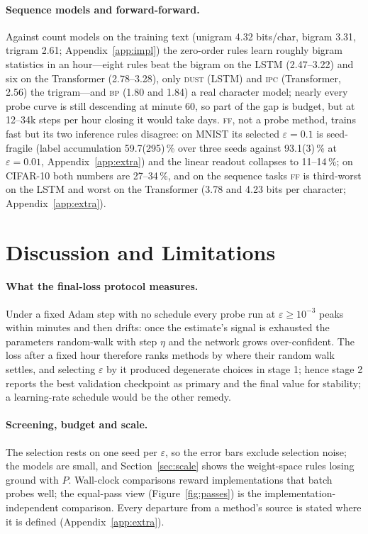 \documentclass{article}
\newcommand{\method}[1]{\textsc{#1}}
\newcommand{\BP}{\method{bp}}
\newcommand{\FF}{\method{ff}}
\newcommand{\DUST}{\method{dust}}
\newcommand{\IPC}{\method{ipc}}
\begin{document}
\paragraph{Sequence models and forward-forward.}
Against count models on the training text (unigram 4.32 bits/char, bigram 3.31,
trigram 2.61; Appendix~\ref{app:impl}) the zero-order rules learn roughly bigram
statistics in an hour---eight rules beat the bigram on the LSTM (2.47--3.22) and six on
the Transformer (2.78--3.28), only \DUST{} (LSTM) and \IPC{} (Transformer, 2.56) the trigram---and \BP{} (1.80 and 1.84) a real
character model; nearly every probe curve is still descending at minute 60, so part of the gap is
budget, but at 12--34k steps per hour closing it would take days. \FF{}, not a probe method, trains fast but its two inference rules disagree: on MNIST its selected $\varepsilon=0.1$ is seed-fragile (label accumulation
59.7(295)\,\% over three seeds against 93.1(3)\,\% at $\varepsilon=0.01$, Appendix~\ref{app:extra}) and the
linear readout collapses to 11--14\,\%; on CIFAR-10 both numbers are 27--34\,\%, and on the sequence tasks \FF{} is third-worst on the LSTM and
worst on the Transformer (3.78 and 4.23 bits per character; Appendix~\ref{app:extra}).

\section{Discussion and Limitations}
\label{sec:discussion}

\paragraph{What the final-loss protocol measures.}
Under a fixed Adam step with no schedule every probe run at $\varepsilon\ge10^{-3}$
peaks within minutes and then drifts: once the estimate's signal is exhausted the
parameters random-walk with step $\eta$ and the network grows over-confident. The loss after a fixed hour therefore ranks methods by where their random walk
settles, and selecting $\varepsilon$ by it produced degenerate choices in stage 1; hence
stage 2 reports the best validation checkpoint as primary and the final value for
stability; a learning-rate schedule would be the other remedy.

\paragraph{Screening, budget and scale.}
The selection rests on one seed per $\varepsilon$, so the error bars exclude selection
noise; the models are small, and Section~\ref{sec:scale} shows the weight-space rules losing
ground with $P$.
Wall-clock comparisons reward implementations that batch probes well; the equal-pass
view (Figure~\ref{fig:passes}) is the implementation-independent comparison. Every
departure from a method's source is stated where it is defined (Appendix~\ref{app:extra}).
\end{document}
